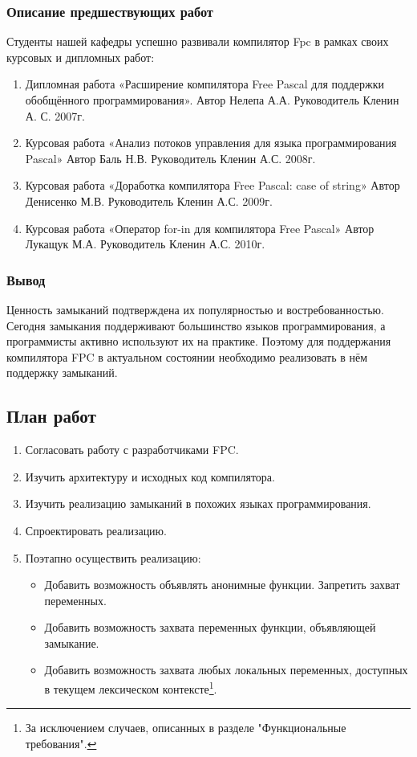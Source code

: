 \documentclass{imcs}
\begin{document}
\subsubsection{Описание предшествующих работ}
Студенты нашей кафедры успешно развивали компилятор Fpc в рамках своих
курсовых и дипломных работ:
\begin{enumerate}
    \item Дипломная работа «Расширение компилятора Free Pascal для поддержки обобщённого программирования». Автор Нелепа А.А. Руководитель Кленин А. С. 2007г.\cite{diplomnelepa}
    \item Курсовая работа «Анализ потоков управления для языка программирования Pascal» Автор Баль Н.В. Руководитель Кленин А.С. 2008г.\cite{coursebal}
    \item Курсовая работа «Доработка компилятора Free Pascal: case of string» Автор Денисенко М.В. Руководитель Кленин А.С. 2009г.\cite{misha}
    \item Курсовая работа «Оператор for-in для компилятора Free Pascal» Автор Лукащук М.А. Руководитель Кленин А.С. 2010г.\cite{courseluck}
\end{enumerate}

\subsubsection{Вывод}

Ценность замыканий подтверждена их популярностью и востребованностью. 
Сегодня замыкания поддерживают большинство языков программирования, а программисты 
активно используют их на практике. Поэтому для поддержания компилятора FPC в 
актуальном состоянии необходимо реализовать в нём поддержку замыканий.

\subsection{План работ}

\begin{enumerate}
    \item Согласовать работу с разработчиками FPC.
    \item Изучить архитектуру и исходных код компилятора.
    \item Изучить реализацию замыканий в похожих языках программирования.
    \item Спроектировать реализацию.
    \item Поэтапно осуществить реализацию:
      \begin{itemize}
          \item Добавить возможность объявлять анонимные функции. Запретить захват переменных.
          \item Добавить возможность захвата переменных функции, объявляющей замыкание.
          \item Добавить возможность захвата любых локальных переменных, 
                доступных в текущем лексическом контексте\footnote{За исключением случаев, описанных в разделе "Функциональные требования".}.
      \end{itemize}        
\end{enumerate}
\end{document}

